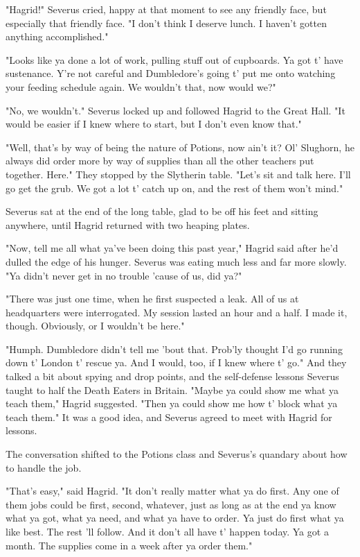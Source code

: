 "Hagrid!" Severus cried, happy at that moment to see any friendly face, but especially that friendly face. "I don't think I deserve lunch. I haven't gotten anything accomplished."

"Looks like ya done a lot of work, pulling stuff out of cupboards. Ya got t' have sustenance. Y're not careful and Dumbledore's going t' put me onto watching your feeding schedule again. We wouldn't that, now would we?"

"No, we wouldn't." Severus locked up and followed Hagrid to the Great Hall. "It would be easier if I knew where to start, but I don't even know that."

"Well, that's by way of being the nature of Potions, now ain't it? Ol' Slughorn, he always did order more by way of supplies than all the other teachers put together. Here." They stopped by the Slytherin table. "Let's sit and talk here. I'll go get the grub. We got a lot t' catch up on, and the rest of them won't mind."

Severus sat at the end of the long table, glad to be off his feet and sitting anywhere, until Hagrid returned with two heaping plates.

"Now, tell me all what ya've been doing this past year," Hagrid said after he'd dulled the edge of his hunger. Severus was eating much less and far more slowly. "Ya didn't never get in no trouble 'cause of us, did ya?"

"There was just one time, when he first suspected a leak. All of us at headquarters were interrogated. My session lasted an hour and a half. I made it, though. Obviously, or I wouldn't be here."

"Humph. Dumbledore didn't tell me 'bout that. Prob'ly thought I'd go running down t' London t' rescue ya. And I would, too, if I knew where t' go." And they talked a bit about spying and drop points, and the self-defense lessons Severus taught to half the Death Eaters in Britain. "Maybe ya could show me what ya teach them," Hagrid suggested. "Then ya could show me how t' block what ya teach them." It was a good idea, and Severus agreed to meet with Hagrid for lessons.

The conversation shifted to the Potions class and Severus's quandary about how to handle the job.

"That's easy," said Hagrid. "It don't really matter what ya do first. Any one of them jobs could be first, second, whatever, just as long as at the end ya know what ya got, what ya need, and what ya have to order. Ya just do first what ya like best. The rest 'll follow. And it don't all have t' happen today. Ya got a month. The supplies come in a week after ya order them."

